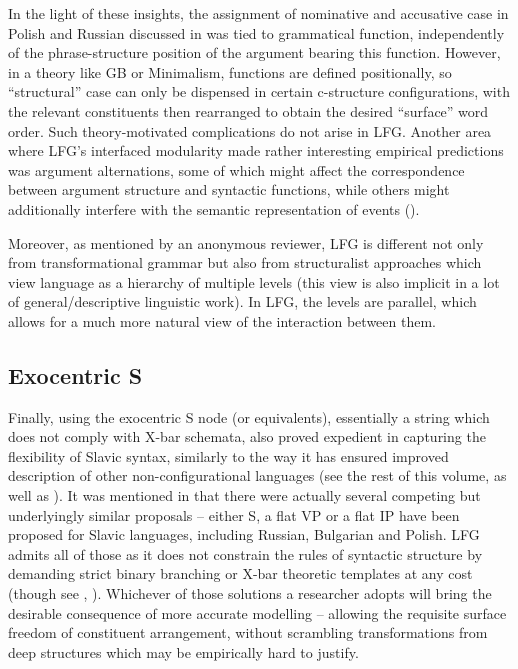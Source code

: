 \documentclass[output=paper,hidelinks]{langscibook}
\begin{document}
In the light of these insights, the assignment of nominative and accusative case in Polish and Russian discussed in  was tied to grammatical function, independently of the phrase-structure position of the argument bearing this function. However, in a theory like GB or Minimalism, functions are defined positionally, so ``structural'' case can only be dispensed in certain c-structure configurations, with the relevant constituents then rearranged to obtain the desired ``surface'' word order. Such theory-motivated complications do not arise in LFG. Another area where LFG's interfaced modularity made rather interesting empirical predictions was argument alternations, some of which might affect the correspondence between argument structure and syntactic functions, while others might additionally interfere with the semantic representation of events (). 

Moreover, as mentioned by an anonymous reviewer, LFG is different not only from transformational grammar but also from structuralist approaches which view language as a hierarchy of multiple levels (this view is also implicit in a lot of general/descriptive linguistic work). In LFG, the levels are parallel, which allows for a much more natural view of the interaction between them.

\subsection{Exocentric S}
\label{sec:Slavic:3.3}

Finally, using the exocentric S node (or equivalents), essentially a string which does not comply with X-bar schemata, also proved expedient in capturing the flexibility of Slavic syntax, similarly to the way it has ensured improved description of other non-configurational languages (see the rest of this volume, as well as \citealt[112--116]{BresnanEtAl2016}). It was mentioned in  that there were actually several competing but underlyingly similar proposals -- either S, a flat VP or a flat IP have been proposed for Slavic languages, including Russian, Bulgarian and Polish. LFG admits all of those as it does not constrain the rules of syntactic structure by demanding strict binary branching or X-bar theoretic templates at any cost (though see \citealt[Chapter~6]{BresnanEtAl2016}, \citealt{lovestrand-lowe2017}). Whichever of those solutions a researcher adopts will bring the desirable consequence of more accurate modelling -- allowing the requisite surface freedom of constituent arrangement, without scrambling transformations from deep structures which may be empirically hard to justify.
\end{document}
